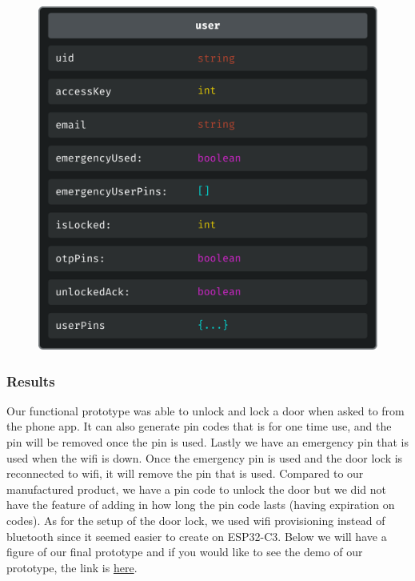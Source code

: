 \begin{figure}[!ht]
    \centering
    \includegraphics[width=1\textwidth]{img/db.png}
    \label{fig:firestoreSchema}
\end{figure}

\subsubsection{Results}

Our functional prototype was able to unlock and lock a door when asked to from the phone app. It can also generate pin codes that is for one time use, and the pin will be removed once the pin is used. Lastly we have an emergency pin that is used when the wifi is down. Once the emergency pin is used and the door lock is reconnected to wifi, it will remove the pin that is used. Compared to our manufactured product, we have a pin code to unlock the door but we did not have the feature of adding in how long the pin code lasts (having expiration on codes). As for the setup of the door lock, we used wifi provisioning instead of bluetooth since it seemed easier to create on ESP32-C3. Below we will have a figure of our final prototype and if you would like to see the demo of our prototype, the link is \href{https://youtu.be/XbD7zrFxasE?si=83Vg6o0KJSXbOtdF}{here}.

